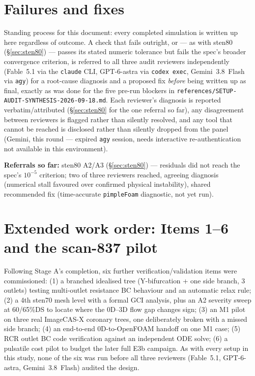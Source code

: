 \documentclass[11pt]{article}
\begin{document}
\section{Failures and fixes}
\label{sec:failures}
Standing process for this document: every completed simulation is written up here regardless of
outcome. A check that fails outright, or --- as with sten80 (\S\ref{sec:sten80}) --- passes its
stated numeric tolerance but fails the spec's broader convergence criterion, is referred to all three
audit reviewers independently (Fable~5.1 via the \texttt{claude} CLI, GPT-6-astra via
\texttt{codex exec}, Gemini~3.8~Flash via \texttt{agy}) for a root-cause diagnosis and a proposed fix
\emph{before} being written up as final, exactly as was done for the five pre-run blockers in
\texttt{references/\allowbreak{}SETUP-AUDIT-SYNTHESIS-2026-09-18.md}. Each reviewer's diagnosis is reported
verbatim/attributed (\S\ref{sec:sten80} for the one referral so far), any disagreement between
reviewers is flagged rather than silently resolved, and any tool that cannot be reached is disclosed
rather than silently dropped from the panel (Gemini, this round --- expired \texttt{agy} session,
needs interactive re-authentication not available in this environment).

\textbf{Referrals so far:} sten80 A2/A3 (\S\ref{sec:sten80}) --- residuals did not reach the spec's
$10^{-5}$ criterion; two of three reviewers reached, agreeing diagnosis (numerical stall favoured over
confirmed physical instability), shared recommended fix (time-accurate \texttt{pimpleFoam} diagnostic,
not yet run).

\section{Extended work order: Items 1--6 and the scan-837 pilot}
\label{sec:workorder}
Following Stage A's completion, six further verification/validation items were commissioned: (1) a
branched idealised tree (Y-bifurcation + one side branch, 3 outlets) testing multi-outlet resistance BC
behaviour and an automatic relax rule; (2) a 4th sten70 mesh level with a formal GCI analysis, plus an
A2 severity sweep at 60/65\%DS to locate where the 0D--3D flow gap changes sign; (3) an M1 pilot on
three real ImageCAS-X coronary trees, one deliberately broken with a missed side branch; (4) an
end-to-end 0D-to-OpenFOAM handoff on one M1 case; (5) RCR outlet BC code verification against an
independent ODE solve; (6) a pulsatile cost pilot to budget the later full E3b campaign. As with every
setup in this study, none of the six was run before all three reviewers (Fable~5.1, GPT-6-astra,
Gemini~3.8~Flash) audited the design.
\end{document}
